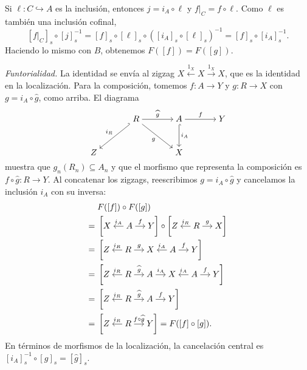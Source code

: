 Si $\ell\colon C\hookrightarrow A$ es la inclusión, entonces $j=i_A\circ\ell$ y $f|_C=f\circ\ell$. Como $\ell$ es también una inclusión cofinal,
\[
[f|_C]_s\circ[j]_s^{-1}
=[f]_s\circ[\ell]_s\circ([i_A]_s\circ[\ell]_s)^{-1}
=[f]_s\circ[i_A]_s^{-1}.
\]
Haciendo lo mismo con $B$, obtenemos $F([f])=F([g])$.

\emph{Funtorialidad.} La identidad se envía al zigzag $X\xleftarrow{1_X}X\xrightarrow{1_X}X$, que es la identidad en la localización. Para la composición, tomemos $f\colon A\to Y$ y $g\colon R\to X$ con $g=i_A\circ\widehat g$, como arriba. El diagrama
\[
\begin{tikzcd}[cramped,column sep=large,row sep=large]
& R \arrow[dl,hook',"i_R"'] \arrow[r,"\widehat g"] \arrow[dr,"g"']
& A \arrow[d,hook,"i_A"] \arrow[r,"f"] & Y\\
Z && X &
\end{tikzcd}
\]
muestra que $g_n(R_n)\subseteq A_n$ y que el morfismo que representa la composición es $f\circ\widehat g\colon R\to Y$. Al concatenar los zigzags, reescribimos $g=i_A\circ\widehat g$ y cancelamos la inclusión $i_A$ con su inversa:
\[
\begin{aligned}
&F([f])\circ F([g])\\
={}&\left[\begin{tikzcd}[cramped,column sep=small,ampersand replacement=\&]
X \& A \arrow[l,"i_A"'] \arrow[r,"f"] \& Y
\end{tikzcd}\right]\circ
\left[\begin{tikzcd}[cramped,column sep=small,ampersand replacement=\&]
Z \& R \arrow[l,"i_R"'] \arrow[r,"g"] \& X
\end{tikzcd}\right]\\
={}&\left[\begin{tikzcd}[cramped,column sep=small,ampersand replacement=\&]
Z \& R \arrow[l,"i_R"'] \arrow[r,"g"] \& X
\& A \arrow[l,"i_A"'] \arrow[r,"f"] \& Y
\end{tikzcd}\right]\\
={}&\left[\begin{tikzcd}[cramped,column sep=small,ampersand replacement=\&]
Z \& R \arrow[l,"i_R"'] \arrow[r,"\widehat g"] \& A \arrow[r,"i_A"] \& X
\& A \arrow[l,"i_A"'] \arrow[r,"f"] \& Y
\end{tikzcd}\right]\\
={}&\left[\begin{tikzcd}[cramped,column sep=small,ampersand replacement=\&]
Z \& R \arrow[l,"i_R"'] \arrow[r,"\widehat g"] \& A \arrow[r,"f"] \& Y
\end{tikzcd}\right]\\
={}&\left[\begin{tikzcd}[cramped,column sep=small,ampersand replacement=\&]
Z \& R \arrow[l,"i_R"'] \arrow[r,"f\circ\widehat g"] \& Y
\end{tikzcd}\right]
=F([f]\circ[g]).
\end{aligned}
\]
En términos de morfismos de la localización, la cancelación central es $[i_A]_s^{-1}\circ[g]_s=[\widehat g]_s$.

